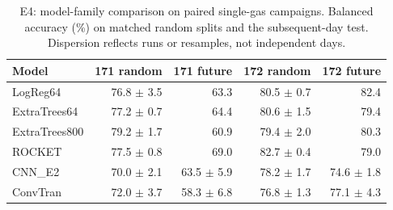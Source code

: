 \begin{table}[t]
\centering\small
\caption{E4: model-family comparison on paired single-gas campaigns. Balanced accuracy (\%) on matched random splits and the subsequent-day test. Dispersion reflects runs or resamples, not independent days.}
\label{tab:e4_models}
\begin{tabular}{@{}lrrrr@{}}
\toprule
Model & 171 random & 171 future & 172 random & 172 future \\
\midrule
LogReg64 & 76.8 $\pm$ 3.5 & 63.3 & 80.5 $\pm$ 0.7 & 82.4 \\
ExtraTrees64 & 77.2 $\pm$ 0.7 & 64.4 & 80.6 $\pm$ 1.5 & 79.4 \\
ExtraTrees800 & 79.2 $\pm$ 1.7 & 60.9 & 79.4 $\pm$ 2.0 & 80.3 \\
ROCKET & 77.5 $\pm$ 0.8 & 69.0 & 82.7 $\pm$ 0.4 & 79.0 \\
CNN\_E2 & 70.0 $\pm$ 2.1 & 63.5 $\pm$ 5.9 & 78.2 $\pm$ 1.7 & 74.6 $\pm$ 1.8 \\
ConvTran & 72.0 $\pm$ 3.7 & 58.3 $\pm$ 6.8 & 76.8 $\pm$ 1.3 & 77.1 $\pm$ 4.3 \\
\bottomrule
\end{tabular}
\end{table}
